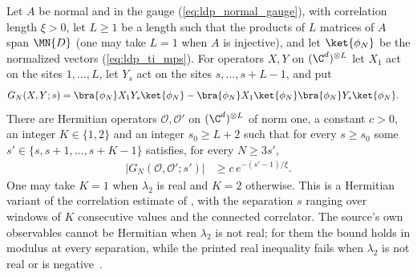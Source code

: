 \begin{lemma}
    \label{thm:ldp_decaying_correlations}
    \leanok
    Let $A$ be normal and in the gauge (\ref{eq:ldp_normal_gauge}), with
    correlation length $\xi>0$, let $L\ge1$ be a length such that the products
    of $L$ matrices of $A$ span $\MN{D}$ (one may take $L=1$ when $A$ is
    injective), and let $\ket{\phi_N}$ be the normalized vectors
    (\ref{eq:ldp_ti_mps}). For operators $X,Y$ on $(\C^d)^{\otimes L}$ let
    $X_1$ act on the sites $1,\dots,L$, let $Y_s$ act on the sites
    $s,\dots,s+L-1$, and put
    \begin{align}
        G_N(X,Y;s)
         & =\bra{\phi_N}X_1Y_s\ket{\phi_N}
        -\bra{\phi_N}X_1\ket{\phi_N}\bra{\phi_N}Y_s\ket{\phi_N}.
        \label{eq:ldp_connected_correlator}
    \end{align}
    There are Hermitian operators $\mathcal O,\mathcal O'$ on
    $(\C^d)^{\otimes L}$ of norm one, a constant $c>0$, an integer
    $K\in\{1,2\}$ and an integer $s_0\ge L+2$ such that for every $s\ge s_0$
    some $s'\in\{s,s+1,\dots,s+K-1\}$ satisfies, for every $N\ge3s'$,
    \begin{align}
        \bigl\lvert G_N(\mathcal O,\mathcal O';s')\bigr\rvert
         & \ge c\,e^{-(s'-1)/\xi}.
        \label{eq:ldp_decaying_correlations}
    \end{align}
    One may take $K=1$ when $\lambda_2$ is real and $K=2$ otherwise. This is a
    Hermitian variant of the correlation estimate of
    \cite[Lemma~2]{Malz2024Preparation}, with the separation $s$ ranging over
    windows of $K$ consecutive values and the connected correlator. The
    source's own observables cannot be Hermitian when $\lambda_2$ is not real;
    for them the bound holds in modulus at every separation, while the printed
    real inequality fails when $\lambda_2$ is not real or is
    negative~\cite{gap:mswc24_decaying_correlations_windowed_connected}.
\end{lemma}
